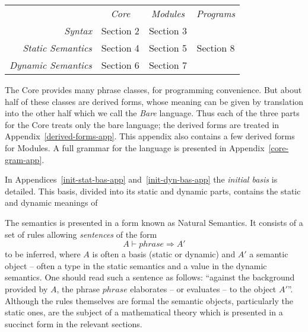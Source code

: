 \vspace*{3mm}
\begin{tabular}{rccc}
                & {\em Core} & {\em Modules} & {\em Programs} \\
\cline{2-4}
{\em Syntax}    &\multicolumn{1}{|c}{Section 2}
                             &\multicolumn{1}{|c}{Section 3}
                                             &\multicolumn{1}{|c|}{ }\\
\cline{2-3}
{\em Static Semantics}
                &\multicolumn{1}{|c}{Section 4}
                             &\multicolumn{1}{|c}{Section 5}
                                             &\multicolumn{1}{|c|}{Section 8}\\
\cline{2-3}
{\em Dynamic Semantics}
                &\multicolumn{1}{|c}{Section 6}
                             &\multicolumn{1}{|c}{Section 7}
                                             &\multicolumn{1}{|c|}{}\\
\cline{2-4}
\end{tabular}
\vspace*{3mm}


The Core provides many phrase classes, for programming convenience.
But about half of these classes are derived forms, whose meaning can be
given by translation into the other half which we call the
{\sl Bare} language.   
Thus each of the three parts for the Core treats only the bare language;
the derived forms are treated in  Appendix~\ref{derived-forms-app}.
This appendix also contains a few derived forms for Modules.
A full grammar for the language is presented in
Appendix~\ref{core-gram-app}.

In Appendices~\ref{init-stat-bas-app} and~\ref{init-dyn-bas-app} 
the {\sl initial basis} is detailed.  This basis,
divided into its static and dynamic parts, contains the static and
dynamic meanings of 

The semantics is presented in a form  known as Natural
Semantics.  It consists of a set of rules allowing 
{\sl sentences} of the form
\[ A \vdash phrase \Rightarrow A' \]
to be inferred, where $A$ is often a basis (static or dynamic) and $A'$ a
semantic object
-- often a type in the static semantics and a value in the dynamic
semantics. One should read such a sentence as follows: ``against
the background provided by
$A$, the phrase $phrase$ elaborates -- or evaluates -- to the object
$A'$''.
Although the rules themselves are formal the semantic
objects, particularly the static ones, are the subject of a mathematical
theory which is presented in a succinct form in the relevant sections.

